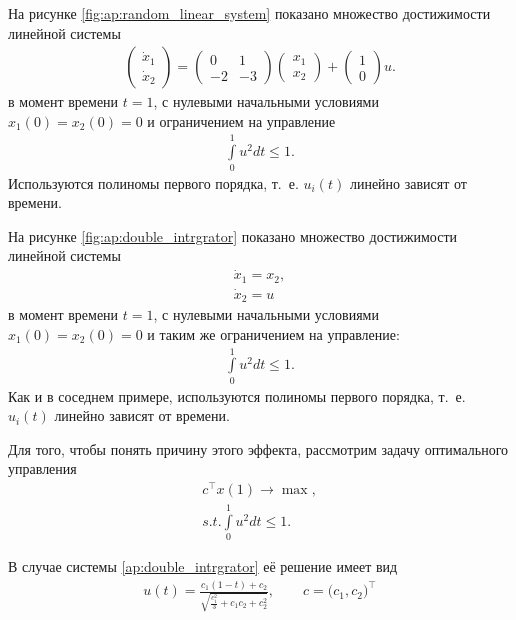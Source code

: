 \documentclass[../main.tex]{subfiles}
\begin{document}
 На рисунке \ref{fig:ap:random_linear_system} показано множество достижимости линейной системы
 \begin{gather}\label{ap:random_linear_system}
 	\begin{pmatrix} 
 		\dot{x}_1 \\
 		\dot{x}_2 
 	\end{pmatrix} = 
 	\begin{pmatrix}
 		0 & 1 \\
 		-2 & -3
 	\end{pmatrix}
 	\begin{pmatrix} 
 		x_1 \\
 		x_2 
 	\end{pmatrix} +
 	\begin{pmatrix} 1 \\ 0
 	\end{pmatrix} u.
 \end{gather}
 в момент времени $t = 1$, с нулевыми начальными условиями $x_1(0) = x_2(0) = 0 $ и ограничением на управление 
 \begin{gather*}
 	\int\limits_0^1 u^2dt \leqslant 1.
 \end{gather*}
 Используются полиномы первого порядка, т.~е. $u_i(t) $ линейно зависят от времени.
 
 На рисунке \ref{fig:ap:double_intrgrator} показано множество достижимости линейной системы
 \begin{gather}\label{ap:double_intrgrator}
 \dot{x}_1 = x_2,\\
 	\dot{x}_2 = u
 \end{gather}
 в момент времени $t = 1$, с нулевыми начальными условиями $x_1(0) = x_2(0) = 0 $ и таким же ограничением на управление: 
 \begin{gather*}
 	\int\limits_0^1 u^2dt \leqslant 1.
 \end{gather*}
 Как и в соседнем примере, используются полиномы первого порядка, т.~е. $u_i(t) $ линейно зависят от времени.
 
 Для того, чтобы понять причину этого эффекта, рассмотрим задачу оптимального управления
 \begin{gather*}
 	c^{\top} x(1) \rightarrow \max, \\
 	s.t. 	\int\limits_0^1 u^2dt \leqslant 1.
 \end{gather*}
 
 В случае системы \eqref{ap:double_intrgrator} её решение имеет вид
 \begin{gather*}
 	u(t) = \frac{c_1(1 - t) + c_2}{\sqrt{\frac{c_1^2}{3} + c_1 c_2 + c_2^2}}, \qquad c = \big(c_1, c_2 \big)^{\top}
 \end{gather*}
 
\end{document}
